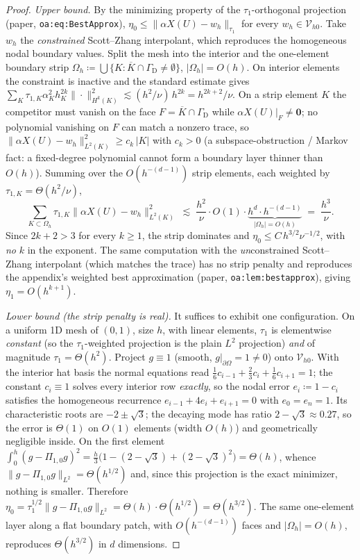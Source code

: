 \documentclass[11pt]{article}
\newcommand{\bzero}{\boldsymbol{0}}
\newcommand{\Vhz}{\mathcal{V}_{h0}}
\newcommand{\Ponez}{\Pi_{1,0}}
\newcommand{\normtau}[1]{\lVert #1 \rVert_{\tau_{1}}}
\theoremstyle{plain}
\theoremstyle{definition}
\theoremstyle{remark}
\begin{document}
\begin{proof}
\emph{Upper bound.} By the minimizing property of the $\tau_1$-orthogonal
projection (paper, \texttt{oa:eq:BestApprox}), $\eta_0\le\normtau{\alpha X(U)-w_h}$
for every $w_h\in\Vhz$. Take $w_h$ the \emph{constrained} Scott--Zhang
interpolant, which reproduces the homogeneous nodal boundary values. Split
the mesh into the interior and the one-element boundary strip
$\Omega_h\coloneqq\bigcup\{K:\overline K\cap\Gamma_{\mathrm D}\neq\emptyset\}$,
$|\Omega_h|=O(h)$. On interior elements the constraint is inactive and the
standard estimate gives $\sum_{K}\tau_{1,K}\alpha_K^2h_K^{2k}\|\cdot\|_{H^k(K)}^2
\lesssim (h^2/\nu)\,h^{2k}=h^{2k+2}/\nu$. On a strip element $K$ the competitor
must vanish on the face $F=\overline K\cap\Gamma_{\mathrm D}$ while
$\alpha X(U)|_F\neq\bzero$; no polynomial vanishing on $F$ can match a nonzero
trace, so $\|\alpha X(U)-w_h\|_{L^2(K)}^2\ge c_k\,|K|$ with $c_k>0$ (a
subspace-obstruction / Markov fact: a fixed-degree polynomial cannot
form a boundary layer thinner than $O(h)$). Summing over the
$O(h^{-(d-1)})$ strip elements, each weighted by $\tau_{1,K}=\Theta(h^2/\nu)$,
\[
  \sum_{K\subset\Omega_h}\tau_{1,K}\|\alpha X(U)-w_h\|_{L^2(K)}^2
  \;\lesssim\;\frac{h^2}{\nu}\cdot O(1)\cdot\underbrace{h^{d}\cdot h^{-(d-1)}}_{|\Omega_h|=O(h)}
  \;=\;\frac{h^3}{\nu}.
\]
Since $2k+2>3$ for every $k\ge1$, the strip dominates and
$\eta_0\le C\,h^{3/2}\nu^{-1/2}$, with \emph{no} $k$ in the exponent. The same
computation with the \emph{un}constrained Scott--Zhang interpolant (which
matches the trace) has no strip penalty and reproduces the appendix's weighted
best approximation (paper, \texttt{oa:lem:bestapprox}), giving
$\eta_1=O(h^{k+1})$.

\emph{Lower bound (the strip penalty is real).} It suffices to exhibit one
configuration. On a uniform 1D mesh of $(0,1)$, size $h$, with linear elements,
$\tau_1$ is elementwise \emph{constant} (so the $\tau_1$-weighted
projection is the plain $L^2$ projection) \emph{and} of magnitude
$\tau_1=\Theta(h^2)$. Project $g\equiv1$ (smooth, $g|_{\partial\Omega}=1\neq0$)
onto $\Vhz$. With the interior hat basis the normal equations read
$\tfrac16 c_{i-1}+\tfrac23 c_i+\tfrac16 c_{i+1}=1$; the constant $c_i\equiv1$
solves every interior row \emph{exactly}, so the nodal error $e_i\coloneqq1-c_i$
satisfies the homogeneous recurrence $e_{i-1}+4e_i+e_{i+1}=0$ with
$e_0=e_n=1$. Its characteristic roots are $-2\pm\sqrt3$; the decaying mode has
ratio $2-\sqrt3\approx0.27$, so the error is $\Theta(1)$ on $O(1)$ elements
(width $O(h)$) and geometrically negligible inside. On the first element
$\int_0^h(g-\Ponez g)^2=\tfrac h3\bigl(1-(2-\sqrt3)+(2-\sqrt3)^2\bigr)=\Theta(h)$,
whence $\|g-\Ponez g\|_{L^2}=\Theta(h^{1/2})$ and, since this projection is the
exact minimizer, nothing is smaller. Therefore
$\eta_0=\tau_1^{1/2}\|g-\Ponez g\|_{L^2}=\Theta(h)\cdot\Theta(h^{1/2})=\Theta(h^{3/2})$.
The same one-element layer along a flat boundary patch, with
$O(h^{-(d-1)})$ faces and $|\Omega_h|=O(h)$, reproduces $\Theta(h^{3/2})$ in
$d$ dimensions.
\end{proof}
\end{document}
